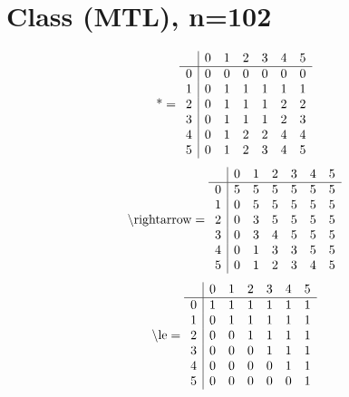 \documentclass[11pt]{article}
\begin{document}
\section{Class (MTL), n=102}
\[\text{*} = 
\begin{array}{r | r r r r r r}
 & 0 & 1 & 2 & 3 & 4 & 5 \\ \hline
0 & 0 & 0 & 0 & 0 & 0 & 0 \\
1 & 0 & 1 & 1 & 1 & 1 & 1 \\
2 & 0 & 1 & 1 & 1 & 2 & 2 \\
3 & 0 & 1 & 1 & 1 & 2 & 3 \\
4 & 0 & 1 & 2 & 2 & 4 & 4 \\
5 & 0 & 1 & 2 & 3 & 4 & 5 \\
\end{array}
\]
\[\text{\textbackslash rightarrow} = 
\begin{array}{r | r r r r r r}
 & 0 & 1 & 2 & 3 & 4 & 5 \\ \hline
0 & 5 & 5 & 5 & 5 & 5 & 5 \\
1 & 0 & 5 & 5 & 5 & 5 & 5 \\
2 & 0 & 3 & 5 & 5 & 5 & 5 \\
3 & 0 & 3 & 4 & 5 & 5 & 5 \\
4 & 0 & 1 & 3 & 3 & 5 & 5 \\
5 & 0 & 1 & 2 & 3 & 4 & 5 \\
\end{array}
\]
\[\text{\textbackslash le} = 
\begin{array}{r | r r r r r r}
 & 0 & 1 & 2 & 3 & 4 & 5 \\ \hline
0 & 1 & 1 & 1 & 1 & 1 & 1 \\
1 & 0 & 1 & 1 & 1 & 1 & 1 \\
2 & 0 & 0 & 1 & 1 & 1 & 1 \\
3 & 0 & 0 & 0 & 1 & 1 & 1 \\
4 & 0 & 0 & 0 & 0 & 1 & 1 \\
5 & 0 & 0 & 0 & 0 & 0 & 1 \\
\end{array}
\]
\end{document}
